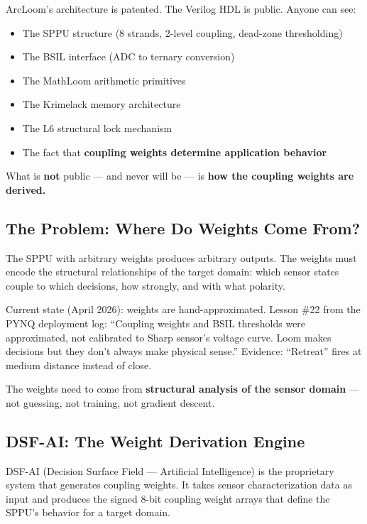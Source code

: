 \documentclass[11pt,a4paper]{article}
\begin{document}
ArcLoom's architecture is patented. The Verilog HDL is public. Anyone can see:
\begin{itemize}
    \item The SPPU structure (8 strands, 2-level coupling, dead-zone thresholding)
    \item The BSIL interface (ADC to ternary conversion)
    \item The MathLoom arithmetic primitives
    \item The Krimelack memory architecture
    \item The L6 structural lock mechanism
    \item The fact that \textbf{coupling weights determine application behavior}
\end{itemize}

What is \textbf{not} public --- and never will be --- is \textbf{how the coupling weights are derived.}

\subsection{The Problem: Where Do Weights Come From?}

The SPPU with arbitrary weights produces arbitrary outputs. The weights must encode the structural relationships of the target domain: which sensor states couple to which decisions, how strongly, and with what polarity.

Current state (April 2026): weights are hand-approximated. Lesson \#22 from the PYNQ deployment log: ``Coupling weights and BSIL thresholds were approximated, not calibrated to Sharp sensor's voltage curve. Loom makes decisions but they don't always make physical sense.'' Evidence: ``Retreat'' fires at medium distance instead of close.

The weights need to come from \textbf{structural analysis of the sensor domain} --- not guessing, not training, not gradient descent.

\subsection{DSF-AI: The Weight Derivation Engine}

DSF-AI (Decision Surface Field --- Artificial Intelligence) is the proprietary system that generates coupling weights. It takes sensor characterization data as input and produces the signed 8-bit coupling weight arrays that define the SPPU's behavior for a target domain.
\end{document}
